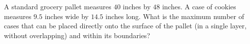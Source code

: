 A standard grocery pallet measures $40$ inches by $48$ inches. A case of cookies measures $9.5$ inches wide by $14.5$ inches long. What is the maximum number of cases that can be placed directly onto the surface of the pallet (in a single layer, without overlapping) and within its boundaries?
